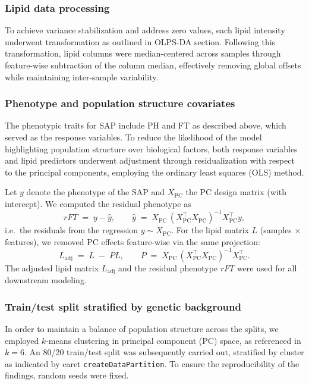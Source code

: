 \documentclass[10pt,letterpaper]{article}
\begin{document}
\subsubsection*{Lipid data processing}
To achieve variance stabilization and address zero values, each lipid intensity underwent transformation as outlined in OLPS-DA section. Following this transformation, lipid columns were median-centered across samples through feature-wise subtraction of the column median, effectively removing global offsets while maintaining inter-sample variability.

\subsubsection*{Phenotype and population structure covariates}
The phenotypic traits for SAP include PH and FT as described above, which served as the response variables. To reduce the likelihood of the model highlighting population structure over biological factors, both response variables and lipid predictors underwent adjustment through residualization with respect to the principal components, employing the ordinary least squares (OLS) method.

Let \(y\) denote the phenotype of the SAP and \(X_{\mathrm{PC}}\) the PC design matrix (with intercept). We computed the residual phenotype as
\[
rFT \;=\; y - \hat{y}, 
\qquad 
\hat{y} \;=\; X_{\mathrm{PC}}\,(X_{\mathrm{PC}}^{\top}X_{\mathrm{PC}})^{-1}X_{\mathrm{PC}}^{\top}y,
\]
i.e.\ the residuals from the regression \(y \sim X_{\mathrm{PC}}\).
For the lipid matrix \(L\) (samples \(\times\) features), we removed PC effects feature-wise via the same projection:
\[
L_{\mathrm{adj}} \;=\; L \;-\; P L,
\qquad
P \;=\; X_{\mathrm{PC}}\,(X_{\mathrm{PC}}^{\top}X_{\mathrm{PC}})^{-1}X_{\mathrm{PC}}^{\top}.
\]
The adjusted lipid matrix \(L_{\mathrm{adj}}\) and the residual phenotype \(rFT\) were used for all downstream modeling.

\subsubsection*{Train/test split stratified by genetic background}
In order to maintain a balance of population structure across the splits, we employed \(k\)-means clustering in principal component (PC) space, as referenced in \(k=6\). An 80/20 train/test split was subsequently carried out, stratified by cluster as indicated by caret \texttt{createDataPartition}. To ensure the reproducibility of the findings, random seeds were fixed.
\end{document}
